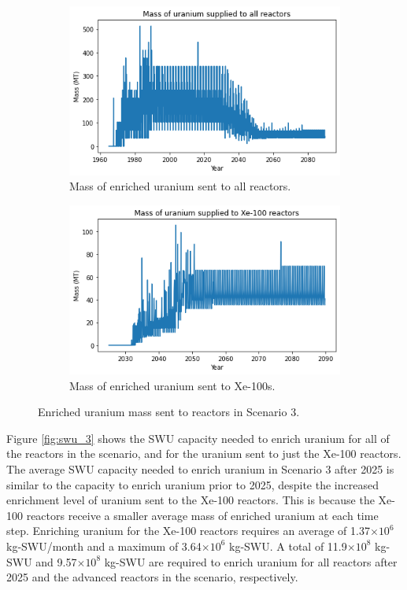 \begin{figure}
    \centering
    \begin{subfigure}{0.45\textwidth}
        \centering
        \includegraphics[scale=0.4]{../figures/fuelsupply_scenarios_3.png}
        \caption{Mass of enriched uranium sent to all reactors.}
        \label{fig:totalfuel_3}
    \end{subfigure}
    \hspace{0.8cm}
    \begin{subfigure}{0.45\textwidth}
        \centering
        \includegraphics[scale=0.4]{../figures/advancedRX_fuelsupply_scenarios_3.png}
        \caption{Mass of enriched uranium sent to Xe-100s.}
        \label{fig:haleu_3}
    \end{subfigure}
    \caption{Enriched uranium mass sent to reactors in Scenario 3.}
    \label{fig:fuel_3}
\end{figure}

Figure \ref{fig:swu_3} shows the \gls{SWU} capacity needed to enrich 
uranium for all of the reactors in the scenario, and for the uranium sent 
to just the Xe-100 reactors. The average \gls{SWU} capacity needed to enrich uranium 
in Scenario 3 after 2025 is similar to the capacity to enrich uranium prior to 2025, 
despite the increased enrichment level of uranium 
sent to the Xe-100 reactors. This is because the Xe-100 reactors receive 
a smaller average mass of enriched uranium at each time step. Enriching uranium 
for the Xe-100 reactors requires an average of 
1.37$\times 10^6$ kg-\gls{SWU}/month and a maximum of 3.64$\times 10^6$
kg-\gls{SWU}. A total of 11.9$\times 10^8$ kg-SWU and 9.57$\times 10^8$
kg-SWU are required 
to enrich uranium for all reactors after 2025 and the advanced reactors in the 
scenario, respectively. 

